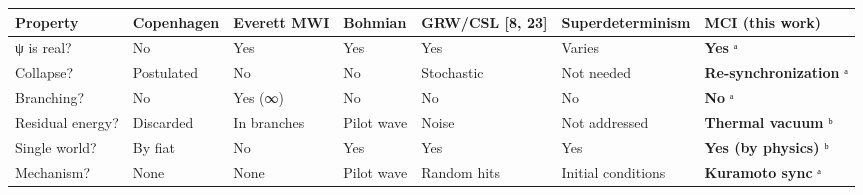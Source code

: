 \documentclass[
]{article}
\newcounter{none} %
\begin{document}
{\def\LTcaptype{none} %
\begin{longtable}[]{@{}
  >{\raggedright\arraybackslash}p{}
  >{\raggedright\arraybackslash}p{}
  >{\raggedright\arraybackslash}p{}
  >{\raggedright\arraybackslash}p{}
  >{\raggedright\arraybackslash}p{}
  >{\raggedright\arraybackslash}p{}
  >{\raggedright\arraybackslash}p{}@{}}
\toprule\noalign{}
\begin{minipage}[b]{\linewidth}\raggedright
Property
\end{minipage} & \begin{minipage}[b]{\linewidth}\raggedright
Copenhagen
\end{minipage} & \begin{minipage}[b]{\linewidth}\raggedright
Everett MWI
\end{minipage} & \begin{minipage}[b]{\linewidth}\raggedright
Bohmian
\end{minipage} & \begin{minipage}[b]{\linewidth}\raggedright
GRW/CSL {[}8, 23{]}
\end{minipage} & \begin{minipage}[b]{\linewidth}\raggedright
Superdeterminism
\end{minipage} & \begin{minipage}[b]{\linewidth}\raggedright
\textbf{MCI (this work)}
\end{minipage} \\
\midrule\noalign{}
\endhead
\bottomrule\noalign{}
\endlastfoot
ψ is real? & No & Yes & Yes & Yes & Varies & \textbf{Yes} ᵃ \\
Collapse? & Postulated & No & No & Stochastic & Not needed &
\textbf{Re-synchronization} ᵃ \\
Branching? & No & Yes (∞) & No & No & No & \textbf{No} ᵃ \\
Residual energy? & Discarded & In branches & Pilot wave & Noise & Not
addressed & \textbf{Thermal vacuum} ᵇ \\
Single world? & By fiat & No & Yes & Yes & Yes & \textbf{Yes (by
physics)} ᵇ \\
Mechanism? & None & None & Pilot wave & Random hits & Initial conditions
& \textbf{Kuramoto sync} ᵃ \\

\end{longtable}}
\end{document}

